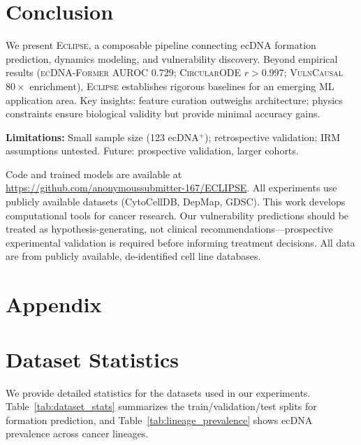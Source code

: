 \documentclass[sigconf,anonymous]{acmart}
\newcommand{\eclipse}{\textsc{Eclipse}}
\newcommand{\former}{\textsc{ecDNA-Former}}
\newcommand{\circularode}{\textsc{CircularODE}}
\newcommand{\vulncausal}{\textsc{VulnCausal}}
\begin{document}
\section{Conclusion}
\label{sec:conclusion}

We present \eclipse{}, a composable pipeline connecting ecDNA formation prediction, dynamics modeling, and vulnerability discovery. Beyond empirical results (\former{} AUROC $0.729$; \circularode{} $r > 0.997$; \vulncausal{} $80\times$ enrichment), \eclipse{} establishes rigorous baselines for an emerging ML application area. Key insights: feature curation outweighs architecture; physics constraints ensure biological validity but provide minimal accuracy gains.

\textbf{Limitations:} Small sample size (123 ecDNA$^+$); retrospective validation; IRM assumptions untested. Future: prospective validation, larger cohorts.


\begin{acks}
Code and trained models are available at \url{https://github.com/anonymoussubmitter-167/ECLIPSE}. All experiments use publicly available datasets (CytoCellDB, DepMap, GDSC). This work develops computational tools for cancer research. Our vulnerability predictions should be treated as hypothesis-generating, not clinical recommendations---prospective experimental validation is required before informing treatment decisions. All data are from publicly available, de-identified cell line databases.
\end{acks}






\clearpage
\appendix

\section*{Appendix}

\section{Dataset Statistics}
\label{app:datasets}

We provide detailed statistics for the datasets used in our experiments. Table~\ref{tab:dataset_stats} summarizes the train/validation/test splits for formation prediction, and Table~\ref{tab:lineage_prevalence} shows ecDNA prevalence across cancer lineages.
\end{document}
